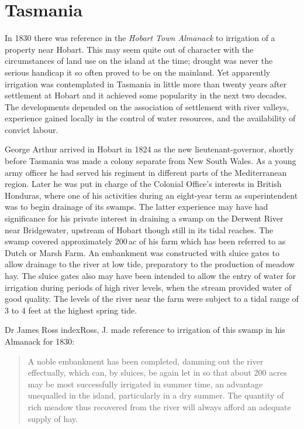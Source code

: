 \section*{Tasmania}
\label{sec:tas}

In 1830 there was reference in the \textsl{Hobart Town Almanack} to
irrigation of a property near Hobart. This may seem
quite out of character with the circumstances of land use on the
island at the time; drought was never the serious handicap it so often
proved to be on the mainland.  Yet apparently irrigation was
contemplated in Tasmania in little more than twenty years after
settlement at Hobart and it achieved some popularity in the next two
decades.  The developments depended on the association of settlement
with river valleys, experience gained locally in the control of water
resources, and the availability of convict labour.

George Arthur arrived in Hobart in 1824 as the new
lieutenant-governor, shortly before Tasmania was made a colony
separate from New South Wales.  As a young army officer he had served
his regiment in different parts of the Mediterranean region.  Later he
was put in charge of the Colonial Office's interests in British
Honduras, where one of his activities during an eight-year term as
superintendent was to begin drainage of its swamps.  The latter
experience may have had significance for his private interest in
draining a swamp on the Derwent River near
Bridgewater, upstream of Hobart though still in its
tidal reaches. The swamp covered approximately 200\,ac of his farm
which has been referred to as Dutch or Marsh Farm.
An embankment was constructed with sluice gates to allow drainage to
the river at low tide, preparatory to the production of meadow hay.
The sluice gates also may have been intended to allow the entry of
water for irrigation during periods of high river levels, when the
stream provided water of good quality.  The levels of the river near
the farm were subject to a tidal range of 3 to 4 feet at the highest
spring tide.

Dr James Ross index{Ross, J.} made reference to irrigation of this
swamp in his Almanack for 1830:
\begin{quote}
	A noble embankment has been completed, damming out the river
        effectually, which can, by sluices, be again let in so that
        about 200 acres may be most successfully irrigated in summer
        time, an advantage unequalled in the island, particularly in a
        dry summer. The quantity of rich meadow thus recovered from
        the river will always afford an adequate supply of
        hay.
\end{quote}

